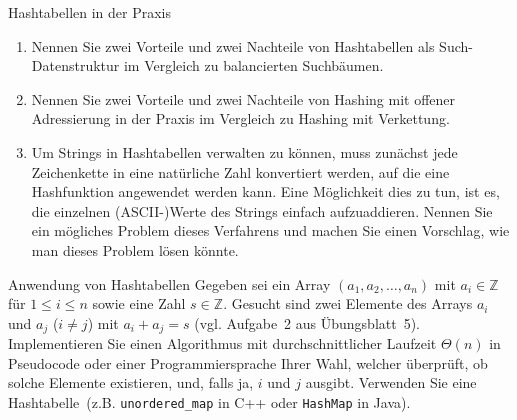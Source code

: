 \documentclass[11pt,a4paper]{article}
\begin{document}
\begin{aufgabe}{3}{Hashtabellen in der Praxis}
    \begin{enumerate}
        \item Nennen Sie zwei Vorteile und zwei Nachteile von Hashtabellen als Such-Datenstruktur im Vergleich zu balancierten Suchbäumen.
        \item Nennen Sie zwei Vorteile und zwei Nachteile von Hashing mit offener Adressierung in der Praxis im Vergleich zu Hashing mit Verkettung.
        \item Um Strings in Hashtabellen verwalten zu können, muss zunächst jede Zeichenkette in eine natürliche Zahl konvertiert werden, auf die eine Hashfunktion angewendet werden kann.
        Eine Möglichkeit dies zu tun, ist es, die einzelnen (ASCII-)Werte des Strings einfach aufzuaddieren.
        Nennen Sie ein mögliches Problem dieses Verfahrens und machen Sie einen Vorschlag, wie man dieses Problem lösen könnte.
    \end{enumerate}
\end{aufgabe}

\begin{aufgabe}{4}{Anwendung von Hashtabellen}
    Gegeben sei ein Array $(a_1, a_2, \ldots, a_n)$ mit $a_i \in \mathbb{Z}$ für $1 \leq i \leq n$ sowie eine Zahl $s \in \mathbb{Z}$.
    Gesucht sind zwei Elemente des Arrays $a_i$ und $a_j$ ($i \neq j$) mit $a_i + a_j = s$ (vgl. Aufgabe~2 aus Übungsblatt~5).
    Implementieren Sie einen Algorithmus mit durchschnittlicher Laufzeit $\Theta(n)$ in Pseudocode oder einer Programmiersprache Ihrer Wahl, welcher überprüft, ob solche Elemente existieren, und, falls ja, $i$ und $j$ ausgibt.
    Verwenden Sie eine Hash\-ta\-bel\-le~(z.B. \texttt{unordered\_map} in C++ oder \texttt{HashMap} in Java).
\end{aufgabe}
\end{document}
